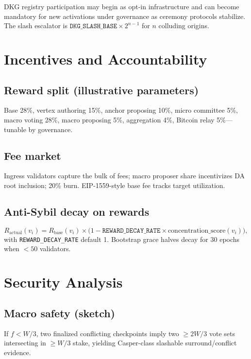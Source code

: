 \documentclass[11pt,a4paper,twoside]{report}
\theoremstyle{definition}
\begin{document}
DKG registry participation may begin as opt-in infrastructure and can become mandatory for new activations under governance as ceremony protocols stabilize. The slash escalator is $\texttt{DKG\_SLASH\_BASE} \times 2^{n-1}$ for $n$ colluding origins.

\chapter{Incentives and Accountability}
\label{sec:incentives-decay}

\section{Reward split (illustrative parameters)}
Base 28\%, vertex authoring 15\%, anchor proposing 10\%, micro committee 5\%, macro voting 28\%, macro proposing 5\%, aggregation 4\%, Bitcoin relay 5\%---tunable by governance.

\section{Fee market}
Ingress validators capture the bulk of fees; macro proposer share incentivizes DA root inclusion; 20\% burn. EIP-1559-style base fee tracks target utilization.

\section{Anti-Sybil decay on rewards}
\begin{equation}
  R_{\mathrm{actual}}(v_i) =
    R_{\mathrm{base}}(v_i) \times \bigl(1 - \texttt{REWARD\_DECAY\_RATE} \times \mathrm{concentration\_score}(v_i)\bigr),
\end{equation}
with \texttt{REWARD\_DECAY\_RATE} default 1. Bootstrap grace halves decay for 30 epochs when $<50$ validators.

\chapter{Security Analysis}

\section{Macro safety (sketch)}
If $f < W/3$, two finalized conflicting checkpoints imply two $\geq 2W/3$ vote sets intersecting in $\geq W/3$ stake, yielding Casper-class slashable surround/conflict evidence.
\end{document}
